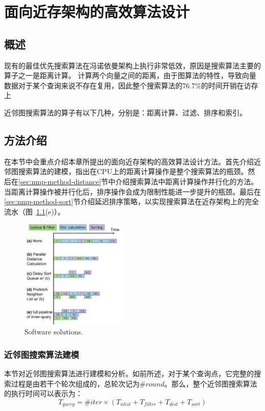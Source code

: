 
\chapter{面向近存架构的高效算法设计}


\section{概述}\label{sec:nmp-overview}
现有的最佳优先搜索算法在冯诺依曼架构上执行非常低效，原因是搜索算法主要的算子之一是距离计算。
计算两个向量之间的距离，由于图算法的特性，导致向量数据对于某个查询来说不存在复用，因此整个搜索算法的76.7\%的时间开销在访存上

近邻图搜索算法的算子有以下几种，分别是：距离计算、过滤、排序和索引。


\section{方法介绍}\label{sec:nmp-method}
在本节中会重点介绍本章所提出的面向近存架构的高效算法设计方法。首先介绍近邻图搜索算法的建模，指出在CPU上的距离计算操作是整个搜索算法的瓶颈。然后在\ref{sec:nmp-method-distance}节中介绍搜索算法中距离计算操作并行化的方法。当距离计算操作被并行化后，排序操作会成为限制性能进一步提升的瓶颈。最后在\ref{sec:nmp-method-sort}节介绍延迟排序策略，以实现搜索算法在近存架构上的完全流水（图~\ref{fig:software-opt}(e)）。

\begin{figure}[htbp]
  \centering
  \includegraphics[width=0.45\textwidth]{figures/context-2/software-opt.pdf}
  \caption{Software solutions. }
  \label{fig:software-opt}
\end{figure}

\subsection{近邻图搜索算法建模}\label{sec:nmp-method-model}
本节对近邻图搜索算法进行建模和分析。如前所述，对于某个查询点，它完整的搜索过程是由若干个轮次组成的，总轮次记为$\#round$。那么，整个近邻图搜索算法的执行时间可以表示为：
\begin{equation}
  T_{query}=\#iter\times \left( T_{nlist}+T_{filter}+T_{dist}+T_{sort} \right)
  \label{eq:nmp-overall}
\end{equation}

